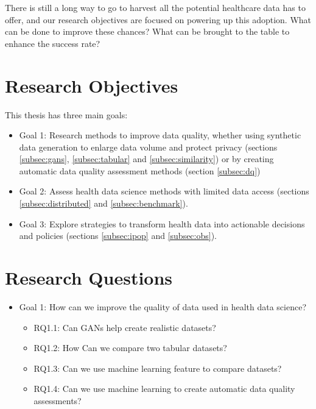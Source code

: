 There is still a long way to go to harvest all the potential healthcare data has to offer, and our research objectives are focused on powering up this adoption. What can be done to improve these chances? What can be brought to the table to enhance the success rate?







\section{Research Objectives}
This thesis has three main goals:


\begin{itemize}
    \item Goal 1: Research methods to improve data quality, whether using synthetic data generation to enlarge data volume and protect privacy (sections \ref{subsec:gans}, \ref{subsec:tabular} and \ref{subsec:similarity}) or by creating automatic data quality assessment methods (section \ref{subsec:dq})

    \item Goal 2: Assess health data science  methods with limited data access (sections \ref{subsec:distributed} and \ref{subsec:benchmark}).

    \item Goal 3: Explore strategies to transform health data into actionable decisions and policies (sections  \ref{subsec:ipop} and \ref{subsec:obs}).
\end{itemize}


\section{Research Questions}

\begin{itemize}
    \item Goal 1: How can we improve the quality of data used in health data science?
    \begin{itemize}
        \item RQ1.1: Can GANs help create realistic datasets?
        \item RQ1.2: How Can we compare two tabular datasets?
        \item RQ1.3: Can we use machine learning feature to compare datasets?
        \item RQ1.4: Can we use machine learning to create automatic data quality assessments?
    \end{itemize}
\end{itemize}

